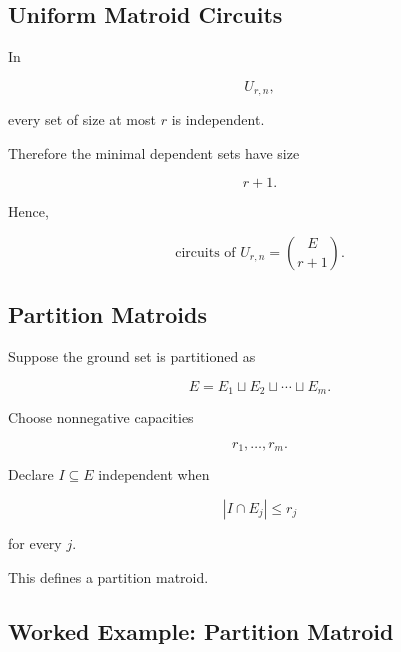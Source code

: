 \subsection{Uniform Matroid Circuits}
\label{subsec:uniform-matroid-circuits}

In

\[
U_{r,n},
\]

every set of size at most \(r\) is independent.

Therefore the minimal dependent sets have size

\[
r+1.
\]

Hence,

\[
\boxed{
\text{circuits of }U_{r,n}
=
\binom{E}{r+1}.
}
\]

\subsection{Partition Matroids}
\label{subsec:partition-matroids}

Suppose the ground set is partitioned as

\[
E
=
E_1\sqcup E_2\sqcup\cdots\sqcup E_m.
\]

Choose nonnegative capacities

\[
r_1,\ldots,r_m.
\]

Declare \(I\subseteq E\) independent when

\[
\boxed{
|I\cap E_j|
\leq
r_j
}
\]

for every \(j\).

This defines a partition matroid.

\subsection{Worked Example: Partition Matroid}
\label{subsec:worked-partition-matroid}

